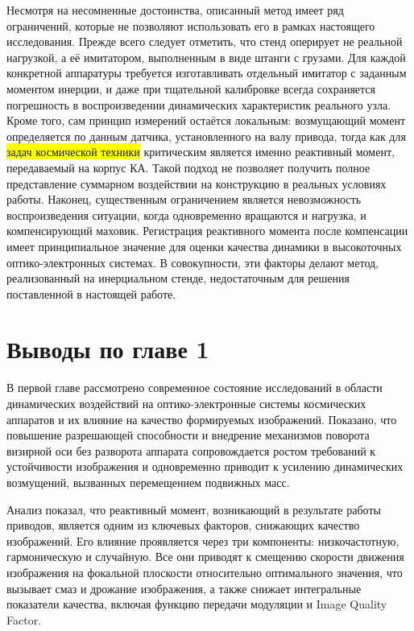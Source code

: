 Несмотря на несомненные достоинства, описанный метод имеет ряд ограничений, которые не позволяют использовать его в рамках настоящего исследования. Прежде всего следует отметить, что стенд оперирует не реальной нагрузкой, а её имитатором, выполненным в виде штанги с грузами. Для каждой конкретной аппаратуры требуется изготавливать отдельный имитатор с заданным моментом инерции, и даже при тщательной калибровке всегда сохраняется погрешность в воспроизведении динамических характеристик реального узла. Кроме того, сам принцип измерений остаётся локальным: возмущающий момент определяется по данным датчика, установленного на валу привода, тогда как для \colorbox{yellow}{задач космической техники} критическим является именно реактивный момент, передаваемый на корпус КА. Такой подход не позволяет получить полное представление суммарном воздействии на конструкцию в реальных условиях работы. Наконец, существенным ограничением является невозможность воспроизведения ситуации, когда одновременно вращаются и нагрузка, и компенсирующий маховик. Регистрация реактивного момента после компенсации имеет принципиальное значение для оценки качества динамики в высокоточных оптико-электронных системах. В совокупности, эти факторы делают метод, реализованный на инерциальном стенде, недостаточным для решения поставленной в настоящей работе.

\section{Выводы по главе 1}
В первой главе рассмотрено современное состояние исследований в области динамических воздействий на оптико-электронные системы космических аппаратов и их влияние на качество формируемых изображений. Показано, что повышение разрешающей способности и внедрение механизмов поворота визирной оси без разворота аппарата сопровождается ростом требований к устойчивости изображения и одновременно приводит к усилению динамических возмущений, вызванных перемещением подвижных масс.

Анализ показал, что реактивный момент, возникающий в результате работы приводов, является одним из ключевых факторов, снижающих качество изображений. Его влияние проявляется через три компоненты: низкочастотную, гармоническую и случайную. Все они приводят к смещению скорости движения изображения на фокальной плоскости относительно оптимального значения, что вызывает смаз и дрожание изображения, а также снижает интегральные показатели качества, включая функцию передачи модуляции и Image Quality Factor.

